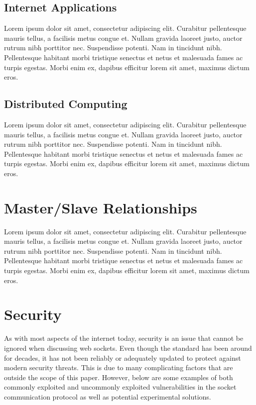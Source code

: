 \documentclass[conference, 12pt]{IEEEtran}
\begin{document}
\subsection{Internet Applications}
Lorem ipsum dolor sit amet, consectetur adipiscing elit. Curabitur pellentesque mauris tellus, a facilisis metus congue et. Nullam gravida laoreet justo, auctor rutrum nibh porttitor nec. Suspendisse potenti. Nam in tincidunt nibh. Pellentesque habitant morbi tristique senectus et netus et malesuada fames ac turpis egestas. Morbi enim ex, dapibus efficitur lorem sit amet, maximus dictum eros. 

\subsection{Distributed Computing}
Lorem ipsum dolor sit amet, consectetur adipiscing elit. Curabitur pellentesque mauris tellus, a facilisis metus congue et. Nullam gravida laoreet justo, auctor rutrum nibh porttitor nec. Suspendisse potenti. Nam in tincidunt nibh. Pellentesque habitant morbi tristique senectus et netus et malesuada fames ac turpis egestas. Morbi enim ex, dapibus efficitur lorem sit amet, maximus dictum eros. 

\section{Master/Slave Relationships}
Lorem ipsum dolor sit amet, consectetur adipiscing elit. Curabitur pellentesque mauris tellus, a facilisis metus congue et. Nullam gravida laoreet justo, auctor rutrum nibh porttitor nec. Suspendisse potenti. Nam in tincidunt nibh. Pellentesque habitant morbi tristique senectus et netus et malesuada fames ac turpis egestas. Morbi enim ex, dapibus efficitur lorem sit amet, maximus dictum eros. 

\section{Security}
As with most aspects of the internet today, security is an issue that cannot be ignored when discussing web sockets. Even though the standard has been around for decades, it has not been reliably or adequately updated to protect against modern security threats. This is due to many complicating factors that are outside the scope of this paper. However, below are some examples of both commonly exploited and uncommonly exploited vulnerabilities in the socket communication protocol as well as potential experimental solutions.
\end{document}
